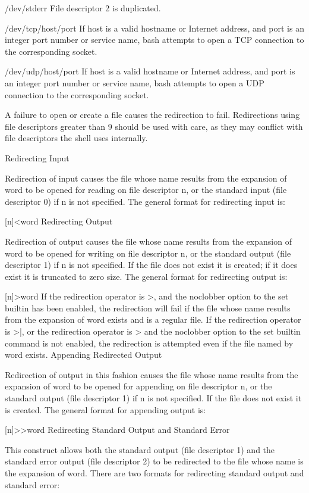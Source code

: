 /dev/stderr
File descriptor 2 is duplicated.

/dev/tcp/host/port
If host is a valid hostname or Internet address, and port is an integer port number or service name, bash attempts to open a TCP connection to the corresponding socket.

/dev/udp/host/port
If host is a valid hostname or Internet address, and port is an integer port number or service name, bash attempts to open a UDP connection to the corresponding socket.

A failure to open or create a file causes the redirection to fail.
Redirections using file descriptors greater than 9 should be used with care, as they may conflict with file descriptors the shell uses internally.

Redirecting Input

Redirection of input causes the file whose name results from the expansion of word to be opened for reading on file descriptor n, or the standard input (file descriptor 0) if n is not specified.
The general format for redirecting input is:

[n]<word
Redirecting Output

Redirection of output causes the file whose name results from the expansion of word to be opened for writing on file descriptor n, or the standard output (file descriptor 1) if n is not specified. If the file does not exist it is created; if it does exist it is truncated to zero size.
The general format for redirecting output is:

[n]>word
If the redirection operator is >, and the noclobber option to the set builtin has been enabled, the redirection will fail if the file whose name results from the expansion of word exists and is a regular file. If the redirection operator is >|, or the redirection operator is > and the noclobber option to the set builtin command is not enabled, the redirection is attempted even if the file named by word exists.
Appending Redirected Output

Redirection of output in this fashion causes the file whose name results from the expansion of word to be opened for appending on file descriptor n, or the standard output (file descriptor 1) if n is not specified. If the file does not exist it is created.
The general format for appending output is:

[n]>>word
Redirecting Standard Output and Standard Error

This construct allows both the standard output (file descriptor 1) and the standard error output (file descriptor 2) to be redirected to the file whose name is the expansion of word.
There are two formats for redirecting standard output and standard error:

